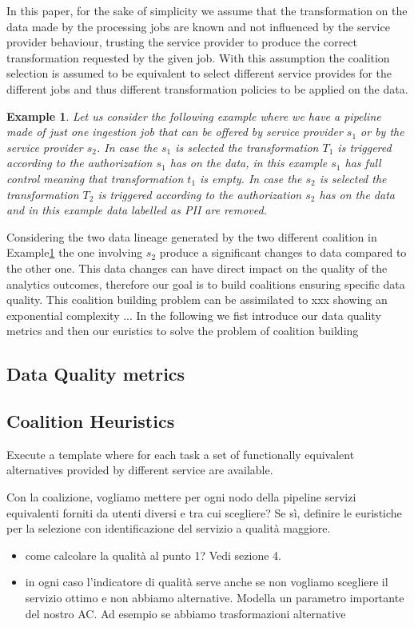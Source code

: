 \documentclass[10pt,journal,compsoc]{IEEEtran}
\newtheorem{example}{Example}[section]
\begin{document}
In this paper, for the sake of simplicity we assume that the transformation on the data made by the processing jobs are known and not influenced by the service provider behaviour, trusting the service provider to produce the correct transformation requested by the given job.
With this assumption the coalition selection is assumed to be equivalent to select different service provides for the different jobs and thus different transformation policies to be applied on the data.

\begin{example}\label{ex:p1j}
Let us consider the following example where we have a pipeline made of just one ingestion job that can be offered by service provider $s_1$ or by the service provider $s_2$. In case the $s_1$ is selected the transformation $T_1$ is triggered according to the authorization $s_1$ has on the data, in this example $s_1$ has full control meaning that transformation $t_1$ is empty. In case the $s_2$ is selected the transformation $T_2$ is triggered according to the authorization $s_2$ has on the data and in this example data labelled as PII are removed. 
\end{example}
Considering the two data lineage generated by the two different coalition in Example\ref{ex:p1j} the one involving $s_2$ produce a significant changes to data compared to the other one. This data changes can have direct impact on the quality of the analytics outcomes, therefore our goal is to build coalitions ensuring specific data quality. This coalition building problem can be assimilated to xxx showing an exponential complexity ...
In the following we fist introduce our data quality metrics and then our euristics to solve the problem of coalition building

\subsection{Data Quality metrics}
\subsection{Coalition Heuristics}






Execute a template where for each task a set of functionally equivalent alternatives provided by different service are available.


Con la coalizione, vogliamo mettere per ogni nodo della pipeline servizi equivalenti forniti da utenti diversi e tra cui scegliere? Se sì, definire le euristiche per la selezione con identificazione del servizio a qualità maggiore.
\begin{itemize}
    \item come calcolare la qualità al punto 1? Vedi sezione 4.
    \item in ogni caso l’indicatore di qualità serve anche se non vogliamo scegliere il servizio ottimo e non abbiamo alternative. Modella un parametro importante del nostro AC. Ad esempio se abbiamo trasformazioni alternative
\end{itemize}
\end{document}
